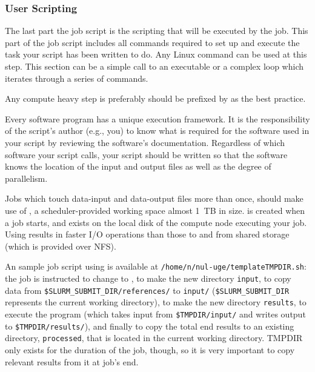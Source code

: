﻿%
\subsubsection{User Scripting}
\label{sect:scripting}

The last part the job script is the scripting that will be executed by the job. 
This part of the job script includes all commands required to set up and 
execute the task your script has been written to do. Any Linux command can be used 
at this step. This section can be a simple call to an executable or a complex 
loop which iterates through a series of commands.

Any compute heavy step is preferably should be prefixed by 
as the best practice.

Every software program has a unique execution framework. It is the responsibility 
of the script's author (e.g., you) to know what is required for the software used 
in your script by reviewing the software's documentation. Regardless of which software
your script calls, your script should be written so that the software knows the 
location of the input and output files as well as the degree of parallelism.
%

Jobs which touch data-input and data-output files more than once, should make use 
of , a scheduler-provided working space almost 1~TB in size.
 is created when a job starts, and exists on the local disk of the
compute node executing your job. Using  results in faster I/O operations 
than those to and from shared storage (which is provided over NFS). 

An sample job script using  is available at \texttt{/home/n/nul-uge/templateTMPDIR.sh}: 
the job is instructed to change to , to make the new directory \texttt{input}, to copy data from
\texttt{\$SLURM\_SUBMIT\_DIR/references/} to \texttt{input/} (\texttt{\$SLURM\_SUBMIT\_DIR} represents the
current working directory), to make the new directory \texttt{results}, to
execute the program (which takes input from \texttt{\$TMPDIR/input/} and writes
output to \texttt{\$TMPDIR/results/}), and finally to copy the total end results
to an existing directory, \texttt{processed}, that is located in the current
working directory.
TMPDIR only exists for the duration of the job, though,
so it is very important to copy relevant results from it at job's end.

